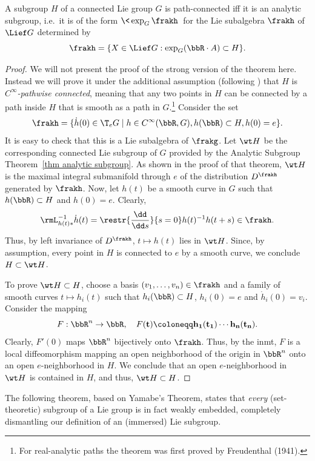 \begin{thm}\label{thm Yamabe}
    A subgroup $H$ of a connected Lie group $G$ is path-connected iff it is an analytic subgroup, i.e.~it is of the form $\<\exp_G\frakh\>$ for the Lie subalgebra $\frakh$ of $\Lief G$ determined by
    \[\frakh=\{X\in\Lief G: \exp_G(\bbR\cdot A)\subset H\}.\]
\end{thm}
\begin{proof}
    We will not present the proof of the strong version of the theorem here. Instead we will prove it under the additional assumption (following \cite[Lem.~1.7.10]{RS2}) that $H$ is \emph{$C^\infty$-pathwise connected}, meaning that any two points in $H$ can be connected by a path inside $H$ that is smooth as a path in $G$.\footnote{For real-analytic paths the theorem was first proved by Freudenthal (1941).} Consider the set
    \[\frakh=\{\dot h(0)\in \T_eG\mid h\in C^\infty(\bbR,G),h(\bbR)\subset H,h(0)=e\}.\]
    It is easy to check that this is a Lie subalgebra of $\frakg$. Let $\wt H$ be the corresponding connected Lie subgroup of $G$ provided by the Analytic Subgroup Theorem~\ref{thm analytic subgroup}. As shown in the proof of that theorem, $\wt H$ is the maximal integral submanifold through $e$ of the distribution $D^\frakh$ generated by $\frakh$. Now, let $h(t)$ be a smooth curve in $G$ such that $h(\bbR)\subset H$ and $h(0)=e$. Clearly,
    \[\rmL_{h(t)\ast}^{-1}\dot h(t)=\restr{\frac{\dd}{\dd s}}{s=0}h(t)^{-1}h(t+s)\in\frakh.\]
    Thus, by left invariance of $D^\frakh$, $t\mapsto h(t)$ lies in $\wt H$. Since, by assumption, every point in $H$ is connected to $e$ by a smooth curve, we conclude $H\subset \wt H$.

    To prove $\wt H\subset H$, choose a basis $(v_1,\ldots,v_n)\in \frakh$ and a family of smooth curves $t\mapsto h_i(t)$ such that $h_i(\bbR)\subset H$, $h_i(0)=e$ and $\dot h_i(0)=v_i$. Consider the mapping
    \[F:\bbR^n\to \bbR,\quad F(\bf{t})\coloneqq h_1(t_1)\cdots h_n(t_n).\]
    Clearly, $F'(0)$ maps $\bbR^n$ bijectively onto $\frakh$. Thus, by the \gls{inmt}, $F$ is a local diffeomorphism mapping an open neighborhood of the origin in $\bbR^n$ onto an open $e$-neighborhood in $H$. We conclude that an open $e$-neighborhood in $\wt H$ is contained in $H$, and thus, $\wt H\subset H$.
\end{proof}

The following theorem, based on Yamabe's Theorem, states that \emph{every} (set-theoretic) subgroup of a Lie group is in fact weakly embedded, completely dismantling our definition of an (immersed) Lie subgroup.

